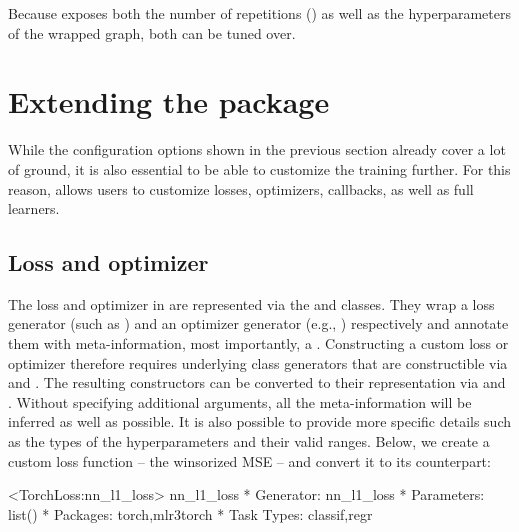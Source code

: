 \documentclass[article]{jss}
\theoremstyle{definition}
\begin{document}
Because  exposes both the number of repetitions () as well as the hyperparameters of the wrapped graph, both can be tuned over.

\section{Extending the package}\label{sec:extending}

While the configuration options shown in the previous section already cover a lot of ground, it is also essential to be able to customize the training further.
For this reason,  allows users to customize losses, optimizers, callbacks, as well as full learners.

\subsection{Loss and optimizer}\label{sec:extending-loss-opt}

The loss and optimizer in \mlrttorch{} are represented via the  and  classes.
They wrap a loss generator (such as ) and an optimizer generator (e.g., ) respectively and annotate them with meta-information, most importantly, a .
Constructing a custom loss or optimizer therefore requires underlying class generators that are constructible via  and .
The resulting constructors can be converted to their \mlrttorch{} representation via  and .
Without specifying additional arguments, all the meta-information will be inferred as well as possible.
It is also possible to provide more specific details such as the types of the hyperparameters and their valid ranges.
Below, we create a custom  loss function -- the winsorized MSE -- and convert it to its \mlrttorch{} counterpart:

\begin{CodeOutput}
<TorchLoss:nn_l1_loss> nn_l1_loss
* Generator: nn_l1_loss
* Parameters: list()
* Packages: torch,mlr3torch
* Task Types: classif,regr
\end{CodeOutput}
\end{document}
